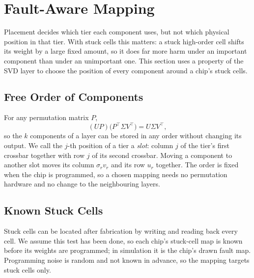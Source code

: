 \section{Fault-Aware Mapping}\label{sec:mapping}

Placement decides which tier each component uses, but not which physical position in that tier. With stuck
cells this matters: a stuck high-order cell shifts its weight by a large fixed amount, so it does far
more harm under an important component than under an unimportant one. This section uses a property of
the SVD layer to choose the position of every component around a chip's stuck cells.

\subsection{Free Order of Components}
For any permutation matrix $P$,
\begin{equation}
(UP)\big(P^{\top}\Sigma V^{\top}\big)=U\Sigma V^{\top},
\label{eq:perm}
\end{equation}
so the $k$ components of a layer can be stored in any order without changing its output. We call the
$j$-th position of a tier a \emph{slot}: column $j$ of the tier's first crossbar together with row $j$ of
its second crossbar. Moving a component to another slot moves its column $\sigma_r v_r$ and its
row $u_r$ together. The order is fixed when the chip is programmed, so a chosen mapping needs no
permutation hardware and no change to the neighbouring layers.

\subsection{Known Stuck Cells}
Stuck cells can be located after fabrication by writing and reading back every cell. We assume this test
has been done, so each chip's stuck-cell map is known before its weights are programmed; in simulation it
is the chip's drawn fault map. Programming noise is random and not known in advance, so the mapping
targets stuck cells only.

